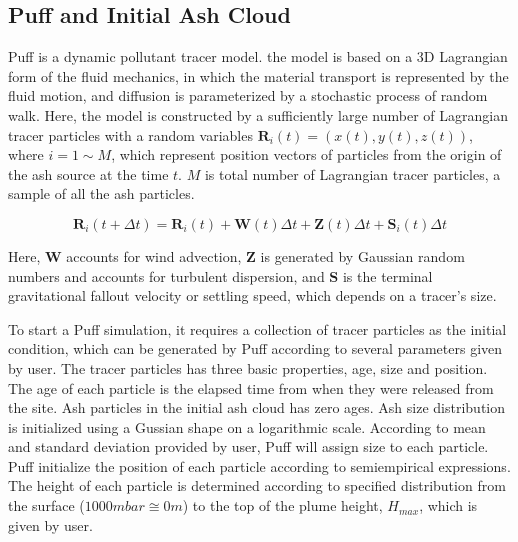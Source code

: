 \documentclass[utf8]{frontiersSCNS} %
\begin{document}
\subsection{Puff and Initial Ash Cloud} \label{sec:puff-model}
 Puff \citep{tanaka1991development,searcy1998puff} is a dynamic pollutant tracer model. the model is based on a 3D Lagrangian form of the fluid mechanics, in which the material transport is represented by the fluid motion, and diffusion is parameterized by a stochastic process of random walk. Here, the model is constructed by a sufficiently large number of  Lagrangian tracer particles with a random variables $\textbf{R}_i(t) = (x(t),y(t),z(t))$, where $ i = 1 \sim M$, which represent position vectors of particles from the origin of the ash source at the time $t$. $M$ is total number of  Lagrangian tracer particles,  a sample of all the ash particles. 
\begin{linenomath*}
\begin{equation}
\textbf{R}_i(t+\Delta t) = \textbf{R}_i(t) + \textbf{W}(t)\Delta t + \textbf{Z}(t)\Delta t + \textbf{S}_i(t) \Delta t
\end{equation}
\end{linenomath*}
Here, $\textbf{W}$ accounts for wind advection, $\textbf{Z}$  is generated by Gaussian random numbers and accounts for turbulent dispersion, and $\textbf{S}$ is the terminal gravitational fallout velocity or settling speed, which depends on a tracer's size.

To start a Puff simulation, it requires a collection of tracer particles as the initial condition, which can be generated by Puff according to several parameters given by user. The tracer particles has three basic properties, age, size and position. The age of each particle is the elapsed time from when they were released from the site. Ash particles in the initial ash cloud has zero ages. Ash size distribution is initialized using a Gussian shape on a logarithmic scale. According to mean and standard deviation provided by user, Puff will assign size to each particle. Puff initialize the position of each particle according to semiempirical expressions. The height of each particle is determined according to specified distribution from the surface ($1000 mbar \cong 0 m$) to the top of the plume height, $H_{max}$, which is given by user.
\end{document}
